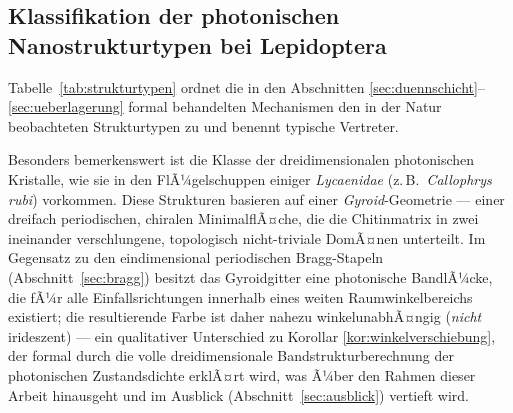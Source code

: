 ﻿\documentclass[a4paper,12pt]{article}
\theoremstyle{definition}
\begin{document}
\subsection{Klassifikation der photonischen Nanostrukturtypen bei Lepidoptera}
\label{sec:klassifikation}

Tabelle~\ref{tab:strukturtypen} ordnet die in den Abschnitten
\ref{sec:duennschicht}--\ref{sec:ueberlagerung} formal behandelten
Mechanismen den in der Natur beobachteten Strukturtypen zu und benennt
typische Vertreter.

\begin{table}[H]
	\centering
	\caption{Klassifikation photonischer Nanostrukturen in
		Schmetterlingsschuppen und ihre dominanten optischen Effekte.
		Quellen: \cite{vukusic2003photonic}, \cite{ghiradella1991light},
		\cite{vigneron2010morpho}.}
	\label{tab:strukturtypen}
\end{table}

Besonders bemerkenswert ist die Klasse der dreidimensionalen photonischen
Kristalle, wie sie in den FlÃ¼gelschuppen einiger \textit{Lycaenidae} (z.\,B.\
\textit{Callophrys rubi}) vorkommen. Diese Strukturen basieren auf einer
\emph{Gyroid}-Geometrie --- einer dreifach periodischen, chiralen
MinimalflÃ¤che, die die Chitinmatrix in zwei ineinander verschlungene,
topologisch nicht-triviale DomÃ¤nen unterteilt. Im Gegensatz zu den
eindimensional periodischen Bragg-Stapeln (Abschnitt~\ref{sec:bragg}) besitzt
das Gyroidgitter eine photonische BandlÃ¼cke, die fÃ¼r alle
Einfallsrichtungen innerhalb eines weiten Raumwinkelbereichs existiert; die
resultierende Farbe ist daher nahezu winkelunabhÃ¤ngig (\emph{nicht}
irideszent) --- ein qualitativer Unterschied zu Korollar
\ref{kor:winkelverschiebung}, der formal durch die volle
dreidimensionale Bandstrukturberechnung der photonischen Zustandsdichte
erklÃ¤rt wird, was Ã¼ber den Rahmen dieser Arbeit hinausgeht und im
Ausblick (Abschnitt~\ref{sec:ausblick}) vertieft wird.
\end{document}
